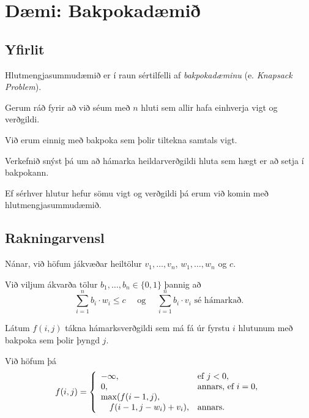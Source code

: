 \section{Dæmi: Bakpokadæmið}
\subsection{Yfirlit}
{
    {
        \item<1-> Hlutmengjasummudæmið er í raun sértilfelli af \emph{bakpokadæminu} (e. \emph{Knapsack Problem}).
        \item<2-> Gerum ráð fyrir að við séum með $n$ hluti sem allir hafa einhverja vigt og verðgildi.
        \item<3-> Við erum einnig með bakpoka sem þolir tiltekna samtals vigt.
        \item<4-> Verkefnið snýst þá um að hámarka heildarverðgildi hluta sem hægt er að setja í bakpokann.
        \item<5-> Ef sérhver hlutur hefur sömu vigt og verðgildi þá erum við komin með hlutmengjasummudæmið.
    }
}

\subsection{Rakningarvensl}
{
    {
        \item<1-> Nánar, við höfum jákvæðar heiltölur $v_1, \dots, v_n$, $w_1, \dots, w_n$ og $c$.
        \item<2-> Við viljum ákvarða tölur $b_1, \dots, b_n \in \{0, 1\}$ þannig að
        \[
            \sum_{i = 1}^n b_i \cdot w_i \leq c
            \quad \text{ og } \quad
            \sum_{i = 1}^n b_i \cdot v_i \text{ sé hámarkað}.
        \]
        \item<3-> Látum $f(i, j)$ tákna hámarksverðgildi sem má fá úr fyrstu $i$ hlutunum með bakpoka sem þolir þyngd $j$.
        \item<4-> Við höfum þá
        \[
            f(i, j) =
            \left \{
            \env{array}
            {
                {l l}
                -\infty, & \text{ef $j < 0$},\\
                0, & \text{annars, ef $i = 0$},\\
                \max(f(i - 1, j), \\
                        \quad f(i - 1, j - w_i) + v_i), & \text{annars}.
            }
            \right .
        \]
    }
}

